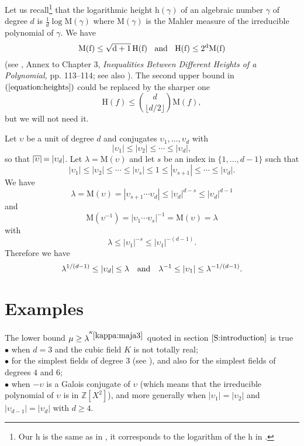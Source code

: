 \documentclass[leqno,11pt]{article}
\def\house#1{\setbox1=\hbox{$\,#1\,$}%
\dimen1=\ht1 \advance\dimen1 by 2pt \dimen2=\dp1 \advance\dimen2 by 2pt
\setbox1=\hbox{\vrule height\dimen1 depth\dimen2\box1\vrule}%
\setbox1=\vbox{\hrule\box1}%
\advance\dimen1 by .4pt \ht1=\dimen1
\advance\dimen2 by .4pt \dp1=\dimen2 \box1\relax}
\def\Z{\mathbb{Z}}
\def\rmh{{\mathrm{h}}}
\def\rmH{{\mathrm{H}}}
\def\rmM{{\mathrm{M}}}
\def\rmM{{\mathrm{M}}}
\def\cst#1{\kappa_{\ref{#1}}}
\begin{document}
Let us recall\footnote{Our $\rmh$ is the same as in \cite{EG}, it corresponds to the logarithm of the $\rmh$ in \cite{BG2debut}.}
 that the logarithmic height $\rmh(\gamma)$ of an algebraic number $\gamma$ of degree $d$ is $\frac{1}{d}\log\rmM(\gamma)$ where $\rmM(\gamma)$ is the Mahler measure of the irreducible polynomial of $\gamma$. 
We have 
\begin{equation}\label{equation:heights}
\rm M(f)\le \sqrt{d+1} \,\rm H(f)\;
\; \hbox{ and }\;\;
\rmH(f)\le 2^d 
\rmM(f) 
\end{equation} 
(see \cite{GL326}, Annex to Chapter 3, {\it Inequalities Between Different Heights of a Polynomial,} pp. 113--114; see also \cite[\S 1.9]{EG}). The second upper bound in $(\ref{equation:heights})$ could be replaced by the sharper one
$$
\rmH(f)\le 
\binom{d }{\lfloor d/2\rfloor}
\rmM(f),
$$
but we will not need it. 

Let $\upsilon$ be a unit of degree $d$ and conjugates $\upsilon_1,\dots,\upsilon_d$ with 
$$
 |\upsilon_1|\le |\upsilon_2|\le \cdots \le |\upsilon_d|, 
 $$
 so that $\house{\upsilon}=|\upsilon_d|$. 
 Let $\lambda=\rmM(\upsilon)$ and let $s$ be an index in $\{1,\dots,d-1\}$ such that
 $$
 |\upsilon_1|\le |\upsilon_2|\le \cdots \le |\upsilon_s|\le 1\le |\upsilon_{s+1}|\le \cdots \le |\upsilon_d|.
 $$
 We have 
 $$
\lambda= \rmM(\upsilon)=|\upsilon_{s+1} \cdots \upsilon_d|\le |\upsilon_d|^{d-s}
\le |\upsilon_d|^{d-1}
$$
and 
$$
 \rmM(\upsilon^{-1})=|\upsilon_1 \cdots \upsilon_s|^{-1}=\rmM(\upsilon)=\lambda
$$ 
with
$$ 
\lambda \le |\upsilon_1|^{-s}
\le |\upsilon_1|^{-(d-1)}.
$$ 
Therefore we have
\begin{equation}\label{Equation:hauteurunite}
\lambda^{1/(d-1)}\le |\upsilon_d|\le \lambda \quad\hbox{and}\quad
\lambda^{-1}\le |\upsilon_1| \le \lambda^{-1/(d-1)}. 
\end{equation}

\section{Examples}\label{S:example}
The lower bound $ \mu \ge \lambda^{\cst{kappa:maja3}}$ quoted in section $\ref{S:introduction}$ is true 
\\
$\bullet$ when $d=3$ and the cubic field $K$ is not totally real;
\\
$\bullet$ for the simplest fields of degree $3$ (see \cite{LW-Thue}), and also for the simplest fields of degrees $4$ and $6$;
\\
$\bullet$ when $-\upsilon$ is a Galois conjugate of $\upsilon$ (which means that the irreducible polynomial of $\upsilon$ is in $\Z[X^2]$), and more generally when $|\upsilon_1|=|\upsilon_2|$ and $|\upsilon_{d-1}|=|\upsilon_d|$ with $d\ge 4$.
\end{document}
